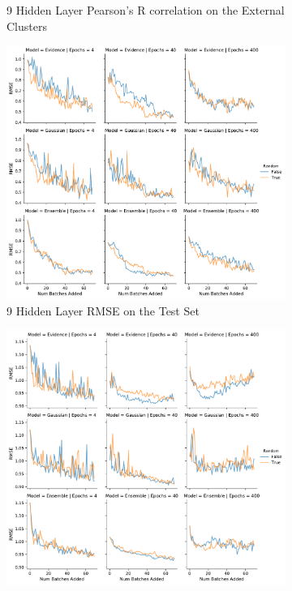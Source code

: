 \documentclass[journal=jmcmar,manuscript=article]{achemso}
\begin{document}
\begin{figure}[tbph]
\begin{subfigure}[b]{0.48\textwidth}
        \caption{9 Hidden Layer Pearson's R correlation on the External Clusters}
    \end{subfigure}%
    \hfill
    \begin{subfigure}[b]{0.48\textwidth}
        \includegraphics[width=1\linewidth]{figures/fig10_morgan_nh9_molbatch_RMSE.pdf}
        \caption{9 Hidden Layer RMSE on the Test Set}
    \end{subfigure}%
    \hfill
    \begin{subfigure}[b]{0.48\textwidth}
        \includegraphics[width=1\linewidth]{figures/fig10_morgan_nh9_molbatch_rest_RMSE.pdf}

\end{subfigure}
\end{figure}
\end{document}
